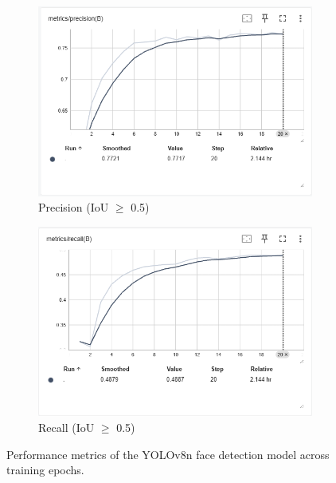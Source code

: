 \begin{figure}[H]
	\begin{subfigure}[b]{0.48\textwidth}
		\includegraphics[width=\textwidth]{figures/chapter4/precision.png}
		\caption{Precision (IoU $\geq$ 0.5)}
	\end{subfigure}
	\hfill
	\begin{subfigure}[b]{0.48\textwidth}
		\includegraphics[width=\textwidth]{figures/chapter4/recall.png}
		\caption{Recall (IoU $\geq$ 0.5)}
	\end{subfigure}
	
	\caption{Performance metrics of the YOLOv8n face detection model across training epochs.}
	\label{fig:yolo-metrics}
\end{figure}





